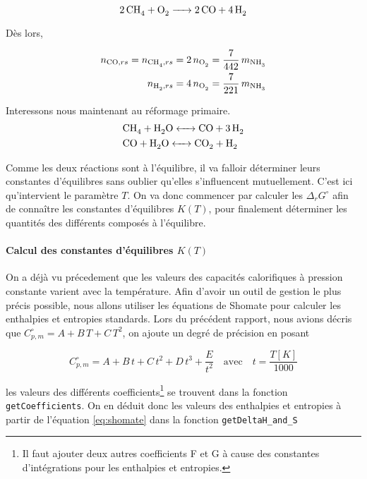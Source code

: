 \begin{equation*}
	\ce{2CH4 + O2 -> 2CO + 4H2}
\end{equation*}

Dès lors, 

\begin{align}
	n_{\ce{CO}, rs} = n_{\ce{CH4}, rs} 
	= 2 \, n_{\ce{O2}} = \frac{7}{442} \, m_{\ce{NH3}} 
	\label{eq:moles1_ref_sec} \\
	n_{\ce{H2}, rs} = 4 \, n_{\ce{O2}} = \frac{7}{221} \, m_{\ce{NH3}}
	\label{eq:moles2_ref_sec}
\end{align}

Interessons nous maintenant au réformage primaire.
\begin{align*}
	&\ce{CH4 + H2O <-> CO + 3H2} \\
	&\ce{CO + H2O <-> CO2 + H2}
\end{align*}

Comme les deux réactions sont à l'équilibre,
il va falloir déterminer leurs constantes d'équilibres sans
oublier qu'elles s'influencent mutuellement.
C'est ici qu'intervient le paramètre $T$. On va donc commencer
par calculer les $\Delta_r G^{\circ}$ afin de conna\^itre les constantes
d'équilibres $K(T)$, pour finalement déterminer les quantités des différents composés
à l'équilibre.

\paragraph{Calcul des constantes d'équilibres $K(T)$}

On a déjà vu précedement que les valeurs des capacités calorifiques
à pression constante varient avec la température. Afin d'avoir un outil de gestion
le plus précis possible, nous allons utiliser les équations de Shomate pour calculer 
les enthalpies et entropies standards. 
Lors du précédent rapport, nous avions décris que $C_{p,m}^{\circ} = A + B \, T + C \, T^2$,
on ajoute un degré de précision en posant

\begin{equation}
	C_{p,m}^{\circ} = A + B \, t + C \, t^2 + D \, t^3 + \frac{E}{t^2}
	\quad \text{avec} \quad t = \frac{T[K]}{1000}
	\label{eq:shomate}
\end{equation}

les valeurs des différents coefficients\footnote{Il faut ajouter deux autres 
coefficients F et G à cause des constantes d'intégrations pour les
enthalpies et entropies.} 
se trouvent \cite{shomate} dans la fonction \texttt{getCoefficients}.
On en déduit donc les valeurs des enthalpies et entropies
à partir de l'équation \ref{eq:shomate} dans la fonction \texttt{getDeltaH\_and\_S}  

